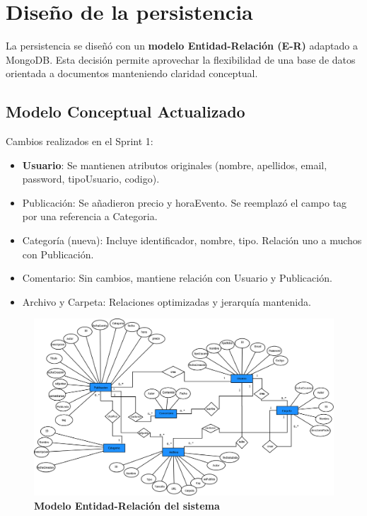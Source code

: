 \section{Diseño de la persistencia}

La persistencia se diseñó con un \textbf{modelo Entidad-Relación (E-R)} adaptado a MongoDB. Esta decisión permite aprovechar la flexibilidad de una base de datos orientada a documentos manteniendo claridad conceptual.

\subsection*{Modelo Conceptual Actualizado}
Cambios realizados en el Sprint 1:
\begin{itemize}
  \item \textbf{Usuario}: Se mantienen atributos originales ({nombre}, {apellidos}, {email}, {password}, {tipoUsuario}, {codigo}).
  \item {Publicación}: Se añadieron {precio} y {horaEvento}. Se reemplazó el campo {tag} por una referencia a {Categoria}.
  \item {Categoría (nueva)}: Incluye {identificador}, {nombre}, {tipo}. Relación uno a muchos con {Publicación}.
  \item {Comentario}: Sin cambios, mantiene relación con {Usuario} y {Publicación}.
  \item {Archivo y Carpeta}: Relaciones optimizadas y jerarquía mantenida.
\end{itemize}

\begin{figure}[H]
  \centering
    \includegraphics[width=15cm]{project/images/Diagrama1.png}
  \caption{\textbf{Modelo Entidad-Relación del sistema}}
  \label{ERModel}
\end{figure}

